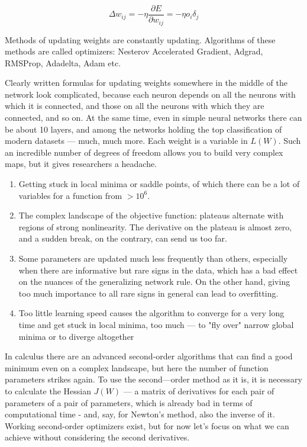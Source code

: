 \begin{equation}
    \label{eq:chain-13}
    \Delta w_{ij}=-\eta {\frac {\partial E}{\partial w_{ij}}}=-\eta o_{i}\delta _{j}
\end{equation}

Methods of updating weights are constantly updating. Algorithms of these methods are called optimizers: Nesterov Accelerated Gradient, Adgrad, RMSProp, Adadelta, Adam etc.

Clearly written formulas for updating weights somewhere in the middle of the network look complicated, because each neuron depends on all the neurons with which it is connected, and those on all the neurons with which they are connected, and so on. At the same time, even in simple neural networks there can be about 10 layers, and among the networks holding the top classification of modern datasets — much, much more. Each weight is a variable in $L(W)$. Such an incredible number of degrees of freedom allows you to build very complex maps, but it gives researchers a headache.

\begin{enumerate}
    \item Getting stuck in local minima or saddle points, of which there can be a lot of variables for a function from $>10^6$.
    \item The complex landscape of the objective function: plateaus alternate with regions of strong nonlinearity. The derivative on the plateau is almost zero, and a sudden break, on the contrary, can send us too far.
    \item Some parameters are updated much less frequently than others, especially when there are informative but rare signs in the data, which has a bad effect on the nuances of the generalizing network rule. On the other hand, giving too much importance to all rare signs in general can lead to overfitting.
    \item Too little learning speed causes the algorithm to converge for a very long time and get stuck in local minima, too much — to "fly over" narrow global minima or to diverge altogether
\end{enumerate}

In calculus there are an advanced second-order algorithms that can find a good minimum even on a complex landscape, but here the number of function parameters strikes again. To use the second—order method as it is, it is necessary to calculate the Hessian $J(W)$ — a matrix of derivatives for each pair of parameters of a pair of parameters, which is already bad in terms of computational time - and, say, for Newton's method, also the inverse of it. Working second-order optimizers exist, but for now let's focus on what we can achieve without considering the second derivatives.

